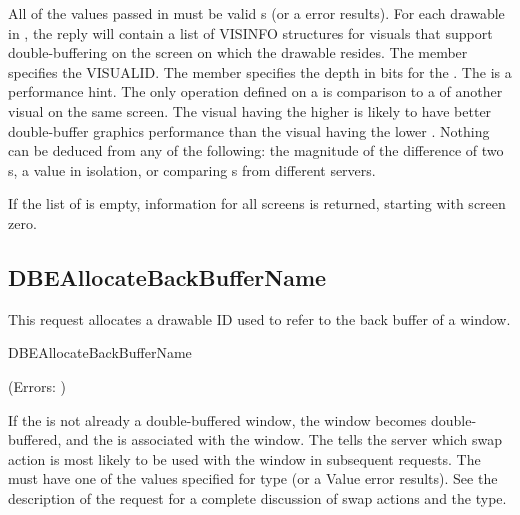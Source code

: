 All of the values passed in  must be valid
s (or a  error results).  For each drawable
in , the reply will contain a list of
VISINFO structures for visuals that support double-buffering on the
screen on which the drawable resides.  The  member
specifies the VISUALID\@.  The  member specifies the
depth in bits for the .  The  is a
performance hint.  The only operation defined on a 
is comparison to a  of another visual on the same
screen.  The visual having the higher  is likely to
have better double-buffer graphics performance than the visual having
the lower .  Nothing can be deduced from any of the
following: the magnitude of the difference of two
s, a  value in isolation, or
comparing s from different servers.

If the list of  is empty, information for
all screens is returned, starting with screen zero.

\subsection{DBEAllocateBackBufferName}

This request allocates a drawable ID used to refer to the back buffer of a
window.

\begin{arequest}{DBEAllocateBackBufferName}
\end{arequest}

(Errors: )

If the  is not already a double-buffered window, the
window becomes double-buffered, and the  is
associated with the window.  The  tells the
server which swap action is most likely to be used with the window in
subsequent  requests.  The
 must have one of the values specified for
type  (or a Value error results).  See the
description of the  request for a complete
discussion of swap actions and the  type.

